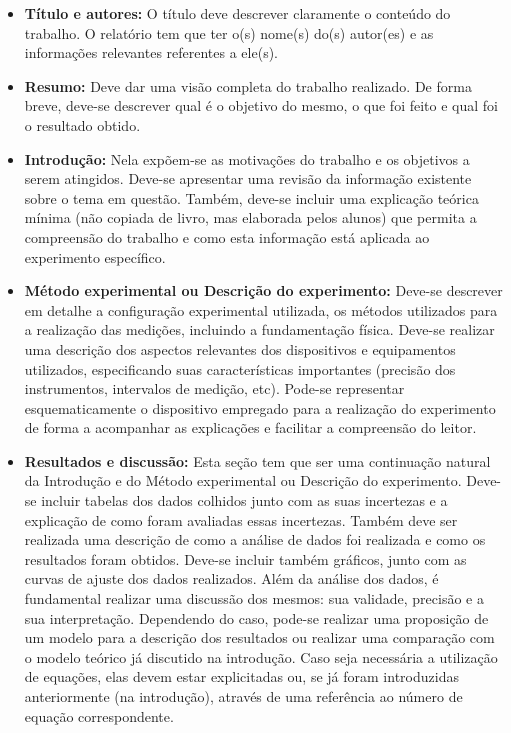 \begin{itemize}
\item {\bf Título e autores:}  O título deve descrever claramente o conteúdo do trabalho. O relatório tem que ter o(s) nome(s) do(s) autor(es) e as informações relevantes referentes a ele(s). 

\item {\bf Resumo:} Deve dar uma visão completa do trabalho realizado. De forma breve, deve-se descrever qual é o objetivo do mesmo, o que foi feito e qual foi o resultado obtido. 

\item {\bf Introdução:} 
Nela expõem-se as motivações do trabalho e os objetivos a serem atingidos. Deve-se apresentar uma revisão da informação existente sobre o tema em questão. Também, deve-se incluir uma explicação teórica mínima (não copiada de livro, mas elaborada pelos alunos) que permita a compreensão do trabalho e como esta informação está aplicada ao experimento específico. 

\item {\bf Método experimental ou Descrição do experimento:} 
Deve-se descrever em detalhe a configuração experimental utilizada, os métodos utilizados para a realização das medições, incluindo a fundamentação física. Deve-se realizar uma descrição dos aspectos relevantes dos dispositivos e equipamentos utilizados, especificando suas características importantes (precisão dos instrumentos, intervalos de medição, etc). Pode-se representar esquematicamente o dispositivo empregado para a realização do experimento de forma a acompanhar as explicações e facilitar a compreensão do leitor. 

\item {\bf Resultados e discussão: }
Esta seção tem que ser uma continuação natural da In\-tro\-du\-ção e do Método experimental ou Descrição do experimento. Deve-se incluir tabelas dos dados colhidos junto com as suas incertezas e a explicação de como foram avaliadas essas incertezas. Também deve ser realizada uma descrição de como a análise de dados foi realizada e como os resultados foram obtidos. Deve-se incluir também gráficos, junto com as curvas de ajuste dos dados realizados.  Além da análise dos dados, é fundamental realizar uma discussão dos mesmos: sua validade, precisão e a sua interpretação. Dependendo do caso, pode-se realizar uma proposição de um modelo para a descrição dos resultados ou realizar uma comparação com o modelo teórico já discutido na introdução. Caso seja necessária a utilização de equações, elas devem estar explicitadas ou, se já foram introduzidas anteriormente (na introdução), através de uma referência ao número de equação correspondente. 


\end{itemize}
